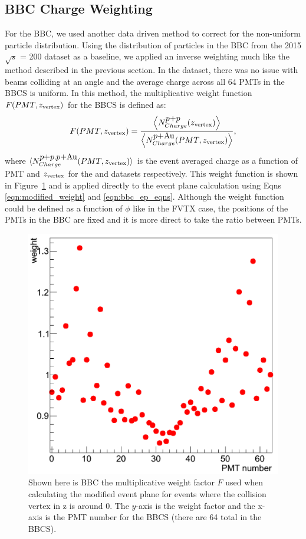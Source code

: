 \subsection{BBC Charge Weighting}
\label{sec:bbc_charge_weight}
For the BBC, we used another data driven method to correct for the non-uniform particle distribution. Using the distribution of particles in the BBC from the 2015 \pp $\sqrt{s}$ = 200 dataset as a baseline, we applied an inverse weighting much like the method described in the previous section. In the \pp dataset, there was no issue with beams colliding at an angle and the average charge across all 64 PMTs in the BBCS is uniform. In this method, the multiplicative weight function $F(PMT,z_{\rm vertex})$ for the BBCS is defined as:
\begin{equation}
F(PMT,z_{\rm vertex}) = \frac{\left<N^{\mbox{$p$+$p$}}_{Charge}(z_{\rm vertex})\right>}{\left<N^{\mbox{$p$+Au}}_{Charge}(PMT,z_{\rm vertex})\right>},
\end{equation}
where $\langle N^{\mbox{$p$+$p$},\mbox{$p$+Au}}_{Charge}(PMT,z_{\rm vertex})\rangle$ is the event averaged charge as a function of PMT and $z_{\rm vertex}$ for the \pp and \pau datasets respectively. 
This weight function is shown in Figure~\ref{fig:bbc_weight_function} and is applied directly to the event plane calculation using Eqns \ref{eqn:modified_weight} and \ref{eqn:bbc_ep_eqns}. 
Although the weight function could be defined as a function of $\phi$ like in the FVTX case, the positions of the PMTs in the BBC are fixed and it is more direct to take the ratio between PMTs.

\begin{figure}[!ht]
\begin{center}
\includegraphics[width=0.5\linewidth]{figs/pmt_ratio_weight.png}
\caption{Shown here is BBC the multiplicative weight factor $F$ used when calculating the modified event plane for events where the collision vertex in z is around 0. The $y$-axis is the weight factor and the x-axis is the PMT number for the BBCS (there are 64 total in the BBCS). }
\label{fig:bbc_weight_function}
\end{center}
\end{figure}

